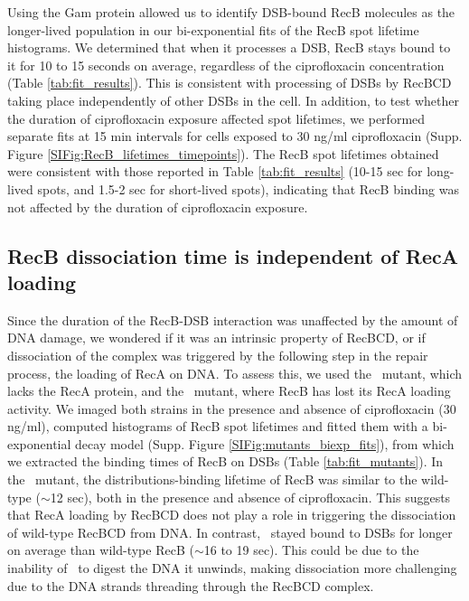 Using the Gam protein allowed us to identify DSB-bound RecB molecules as the longer-lived population in our bi-exponential fits of the RecB spot lifetime histograms. We determined that when it processes a DSB, RecB stays bound to it for 10 to 15 seconds on average, regardless of the ciprofloxacin concentration (Table \ref{tab:fit_results}). This is consistent with processing of DSBs by RecBCD taking place independently of other DSBs in the cell. In addition, to test whether the duration of ciprofloxacin exposure affected spot lifetimes, we performed separate fits at 15 min intervals for cells exposed to 30 ng/ml ciprofloxacin (Supp. Figure \ref{SIFig:RecB_lifetimes_timepoints}). The RecB spot lifetimes obtained were consistent with those reported in Table \ref{tab:fit_results} (10-15 sec for long-lived spots, and 1.5-2 sec for short-lived spots), indicating that RecB binding was not affected by the duration of ciprofloxacin exposure.

\subsection*{RecB dissociation time is independent of RecA loading}
Since the duration of the RecB-DSB interaction was unaffected by the amount of DNA damage, we wondered if it was an intrinsic property of RecBCD, or if dissociation of the complex was triggered by the following step in the repair process, the loading of RecA on DNA. To assess this, we used the \dreca\ mutant, which lacks the RecA protein, and the \geneteneighty\ mutant, where RecB has lost its RecA loading activity. We imaged both strains in the presence and absence of ciprofloxacin (30 ng/ml), computed histograms of RecB spot lifetimes and fitted them with a bi-exponential decay model (Supp. Figure \ref{SIFig:mutants_biexp_fits}), from which we extracted the binding times of RecB on DSBs (Table \ref{tab:fit_mutants}). In the \dreca\ mutant, the distributions-binding lifetime of RecB was similar to the wild-type ($\sim$12 sec), both in the presence and absence of ciprofloxacin. This suggests that RecA loading by RecBCD does not play a role in triggering the dissociation of wild-type RecBCD from DNA. In contrast, \teneighty\ stayed bound to DSBs for longer on average than wild-type RecB ($\sim$16 to 19 sec). This could be due to the inability of \teneighty\ to digest the DNA it unwinds, making dissociation more challenging due to the DNA strands threading through the RecBCD complex.

